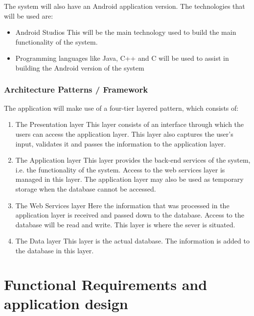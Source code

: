 \documentclass[hidelinks,a4paper,12pt]{article}
\begin{document}
		
		The system will also have an Android application version. The technologies that will be used are:
			\begin{itemize} 
		\item Android Studios
		\newline
		This will be the main technology used to build the main functionality of the system.
		
		\item Programming languages like Java, C++ and C will be used to assist in building the Android version of the system  
		\end{itemize} 
		
		\subsubsection{ Architecture Patterns / Framework }
		
		The application will make use of a four-tier layered pattern, which consists of:
	
	\begin{enumerate} 
			\item The Presentation layer
			\newline
		This layer consists of an interface through which the users can access the application layer. This 	layer also captures the user's input, validates it and passes the information to the application 	layer.
		
			\item The Application layer 
			\newline
		This layer provides the back-end services of the system, i.e. the functionality of the system. 	Access to the web services layer is managed in this layer. The application layer may also be 	used as temporary storage when the database cannot be accessed.
		
			\item The Web Services layer
			\newline
		Here the information that was processed in the application layer is received and passed 	down to the database. Access to the database will be read and write. This layer is where the 	sever is situated.
		
			\item The Data layer
			\newline
		This layer is the actual database. The information is added to the database in this layer.
	\end{enumerate}
	
	\section{Functional Requirements and application design}
\end{document}
